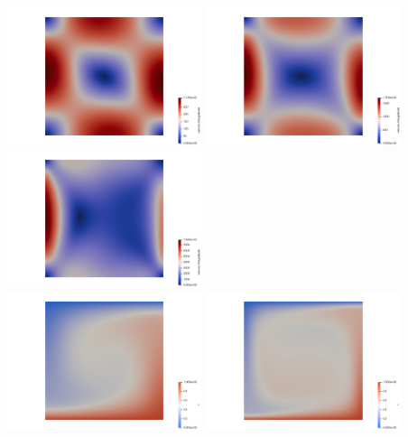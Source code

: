 \begin{center}
\includegraphics[width=5.7cm]{python_codes/fieldstone_110/results_EBA/vel_1e4}
\includegraphics[width=5.7cm]{python_codes/fieldstone_110/results_EBA/vel_1e5}
\includegraphics[width=5.7cm]{python_codes/fieldstone_110/results_EBA/vel_1e6}\\
\includegraphics[width=5.7cm]{python_codes/fieldstone_110/results_EBA/T_1e4}
\includegraphics[width=5.7cm]{python_codes/fieldstone_110/results_EBA/T_1e5}

\end{center}
